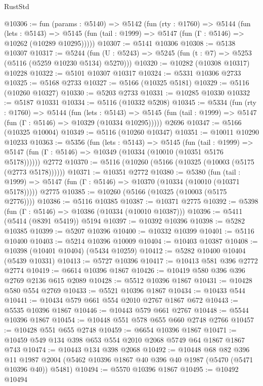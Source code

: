 \begin{lexlean}{RustStd}
\begin{coremodule}
{\begin{coremodule}
{{{{{{{{{{{{{{{{{{{{{{{{{{{{{{{@10306 := fun (params : @5140) =>
  @5142
    (fun (rty : @1760) =>
    @5144
      (fun (lets : @5143) =>
      @5145 (fun (tail : @1999) => @5147 (fun (Γ : @5146) => @10262 (@10289 @10295)))))
@10307 := @5141 @10306
@10308 := @5138 @10307
@10317 := @5244
    (fun (U : @5243) => @5245 (fun (t : @7) => @5253 (@5116 (@5259 @10230 @5134) @5270)))
@10320 := @10282 (@10308 @10317) @10228
@10322 := @5101 @10307 @10317
@10324 := @5331 @10306 @2733
@10325 := @5168 @2733
@10327 := @5166 (@10325 @5181)
@10329 := @5116 (@10260 @10327)
@10330 := @5203 @2733
@10331 := @10285 @10330
@10332 := @5187 @10331
@10334 := @5116 (@10332 @5208)
@10345 := @5334
    (fun (rty : @1760) =>
    @5144
      (fun (lets : @5143) =>
      @5145 (fun (tail : @1999) => @5147 (fun (Γ : @5146) => @10329 (@10334 @10295)))))
    @2696
@10347 := @5166 (@10325 @10004)
@10349 := @5116 (@10260 @10347)
@10351 := @10011 @10290 @10233
@10363 := @5356
    (fun (lets : @5143) =>
    @5145
      (fun (tail : @1999) =>
      @5147 (fun (Γ : @5146) => @10349 (@10334 (@10010 (@10351 @5176 @5178))))))
    @2772
@10370 := @5116 (@10260 (@5166 (@10325 (@10003 (@5175 (@2773 @5178))))))
@10371 := @10351 @2772
@10380 := @5380
    (fun (tail : @1999) => @5147 (fun (Γ : @5146) => @10370 (@10334 (@10010 (@10371 @5178)))))
    @2775
@10385 := @10260 (@5166 (@10325 (@10003 (@5175 @2776))))
@10386 := @5116 @10385
@10387 := @10371 @2775
@10392 := @5398 (fun (Γ : @5146) => @10386 (@10334 (@10010 @10387)))
@10396 := @5411 (@5414 (@8391 @5419)) @5194
@10397 := @10392 @10396
@10398 := @5282 @10385
@10399 := @5207 @10396
@10400 := @10332 @10399
@10401 := @5116 @10400
@10403 := @5214 @10396 @10009
@10404 := @10403 @10387
@10408 := @10398 (@10401 @10404) (@5434 @10259)
@10412 := @5282 @10400 @10404 (@5439 @10331)
@10413 := @5727 @10396
@10417 := @10413 @581 @396 @2772 @2774
@10419 := @6614 @10396 @1867
@10426 := @10419 @580 @396 @396 @2769 @2136 @615 @2089
@10428 := @5512 @10396 @1867
@10431 := @10428 @580 @554 @2769
@10433 := @5521 @10396 @1867
@10434 := @10433 @544
@10441 := @10434 @579 @661 @554 @2010 @2767 @1867 @672
@10443 := @5535 @10396 @1867
@10446 := @10443 @579 @661 @2767
@10448 := @5544 @10396 @1867
@10454 := @10448 @551 @578 @655 @660 @2748 @2766
@10457 := @10428 @551 @655 @2748
@10459 := @6654 @10396 @1867
@10471 := @10459 @549 @134 @398 @653 @554 @2010 @2068 @5749 @64 @1867 @1867 @743
@10474 := @10443 @134 @398 @2068
@10492 := @10448
    @68
    @82
    @396
    @11
    @1987
    @2004
    (@5462 @10396 @1867 @40 @396 @40 @1987 (@5470 (@5471 @10396 @40)) @5481)
@10494 := @5570 @10396 @1867
@10495 := @10492 @10494
}}}}}}}}}}}}}}}}}}}}}}}}}}}}}}}
\end{coremodule}}
\end{coremodule}
\end{lexlean}
